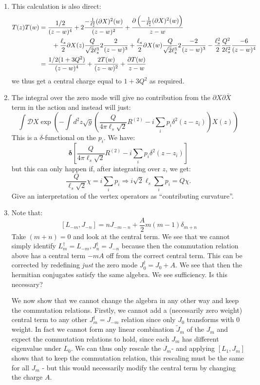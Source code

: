 \documentclass[11pt]{article}
\begin{document}
\begin{enumerate}
	
	\item This calculation is also direct:
	\[
	\begin{aligned}
		T(z) T(w) &= \frac{1/2}{(z-w)^4} + 2\frac{-\frac{1}{\ell_s^2} (\partial X)^2(w)}{(z-w)^2} + \frac{\partial \left(-\frac{1}{\ell_s^2} (\partial X)^2(w)\right)}{z-w} \\
		& \qquad + \frac{\ell_s}{2} \partial X(z) \frac{Q}{\sqrt2 \ell_s^3} 2\frac{2}{(z-w)^3} + \frac{\ell_s}{2} \partial X(w) \frac{Q}{\sqrt2 \ell_s^3} 2\frac{-2}{(z-w)^3} -\frac{\ell_s^2}{2} \frac{Q^2}{2\ell_s^2} \frac{-6}{(z-w)^4}\\
		&= \frac{1/2 (1 + 3 Q^2)}{(z-w)^4} + \frac{2 T(w)}{(z-w)^2} + \frac{\partial T(w)}{z-w}
	\end{aligned}
	\]
	we thus get a central charge equal to $1 + 3 Q^2$ as required. 
	
	\item The integral over the zero mode will give no contribution from the $\partial X \partial \bar X$ term in the action and instead will just:
	\[
		\int \mathcal D X \exp\left(- \int d^2 z \sqrt{g} \left(\frac{ Q}{4 \pi \ell_s \sqrt{2} } R^{(2)} - i \sum_{i} p_i \delta^2(z-z_i) \right) X(z) \right)
	\]
	This is a $\delta$-functional on the $p_i$. We have:
	\[
		\boldsymbol{\delta}\left[ \frac{Q}{4 \pi \ell_s \sqrt{2} } R^{(2)} - i \sum_{i} p_i \delta^2(z-z_i) \right]
	\]
	but this can only happen if, after integrating over $z$, we get:
	\[
		\frac{Q}{\ell_s \sqrt 2} \chi = i \sum_i p_i \Rightarrow i \sqrt{2} \ell_s \sum_i p_i = Q \chi.
	\]
	Give an interpretation of the vertex operators as ``contributing curvature''.
	
	\item Note that:
	\[
		\, [L_{-m}, J_{-n}] = n J_{-m - n} + \frac{A}{2} m (m-1) \delta_{m+n} %
	\]
	Take $(m+n)=0$ and look at the central term. We see that we cannot simply identify $L^{\dagger}_{m} = L_{-m}, J^\dagger_{n} = J_{-n}$ because then the commutation relation above has a central term  $-m A$ off from the correct central term. This can be corrected by redefining \emph{just} the zero mode  $J^\dagger_0 = J_0 + A$. We see that then the hermitian conjugates satisfy the same algebra. We see sufficiency. Is this necessary? 
	
	We now show that we cannot change the algebra in any other way and keep the commutation relations. Firstly, we cannot add a (necessarily zero weight) central term to any other $J_m^\dagger = J_{-m}$ relation since only $J_0$ transforms with $0$ weight. In fact we cannot form any linear combination $\tilde J_m$ of the $J_m$ and expect the commutation relations to hold, since each $J_m$ has different eigenvalue under $L_0$. We can thus only rescale the $J_m$- and applying $[L_1, J_m]$ shows that to keep the commutation relation, this rescaling must be the same for all $J_m$ - but this would necessarily modify the central term by changing the charge $A$. 


\end{enumerate}
\end{document}

